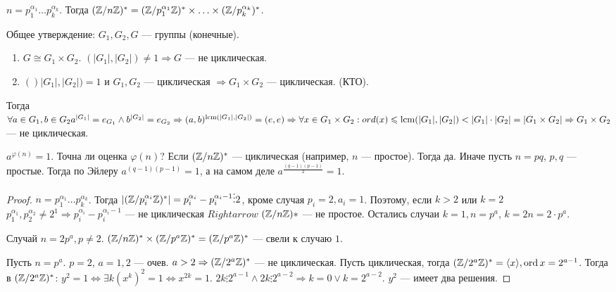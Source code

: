     $n = p_1^{\alpha_1} \ldots p_k^{\alpha_k}$. Тогда $(\mathbb{Z} / n \mathbb{Z})^* = (\mathbb{Z} / p_1^{\alpha_1} \mathbb{Z})^* \times \ldots \times (\mathbb{Z} / p_k ^{\alpha_k})^*$. 

    Общее утверждение:  $G_1, G_2, G$ --- группы (конечные). 
    \begin{enumerate}
        \item $G \cong G_1 \times G_2$. $(|G_1|, |G_2|) \neq 1 \Rightarrow G$ --- не циклическая.
        \item $()|G_1|, |G_2|) = 1$ и $G_1, G_2$ --- циклическая $\Rightarrow G_1 \times G_2$ --- циклическая. (КТО).
    \end{enumerate}

    Тогда $\forall a \in G_1, b \in G_2 a^{|G_1|} = e_{G_1} \land b^{|G_2|} = e_{G_2} \Rightarrow (a, b)^{\operatorname*{lcm}(|G_1|, |G_2|)} = (e, e) \Rightarrow \forall x \in G_1 \times G_2: ord(x) \leqslant \operatorname*{lcm}(|G_1|, |G_2|) < |G_1| \cdot |G_2| = |G_1\times G_2| \Rightarrow G_1 \times G_2$ --- не циклическая.
\begin{remark}
    $a^{\varphi(n)} = 1$. Точна ли оценка  $\varphi(n)$? Если  $(\mathbb{Z} / n\mathbb{Z})^*$ --- циклическая (например, $n$ --- простое). Тогда да. Иначе пусть $n = pq$,  $p,q$ --- простые. Тогда  по Эйлеру $a^{(q-1)(p-1)} = 1$, а на самом деле  $a^{\frac{(q-1)(p-1)}{2}} = 1$. 
\end{remark}
\begin{proof}
    $n = p_1^{\alpha_1} \ldots p_k^{\alpha_k}$. Тогда $|(\mathbb{Z} / p_i^{\alpha_i} \mathbb{Z})^*| = p_i^{\alpha_i} - p_i^{\alpha_i - 1} \vdots 2$, кроме случая  $p_i = 2, a_i = 1$. Поэтому, если  $k > 2$ или  $k = 2$ $p_1^{\alpha_1}, p_2^{\alpha_2} \neq 2^1 \Rightarrow p_i^{\alpha_i} - p_i^{\alpha_i - 1}$ --- не циклическая  $Rightarrow$  $(\mathbb{Z} / n\mathbb{Z})*$ --- не простое. Остались случаи  $k=1, n=p^a$,  $k=2 n = 2 \cdot p^a$.

    Случай  $n = 2p^a, p \neq 2$.  $(\mathbb{Z} / n \mathbb{Z})^* \times (\mathbb{Z} / p^a \mathbb{Z})^* = (\mathbb{Z} / p^a \mathbb{Z})^*$ --- свели к случаю  $1$.

    Пусть  $n = p^a$.  $p=2$,  $a = 1,2$ --- очев.  $a>2 \Rightarrow (\mathbb{Z} / 2^a \mathbb{Z})^*$ --- не циклическая. Пусть циклическая, тогда $(\mathbb{Z} / 2^a \mathbb{Z})^* = \langle x \rangle, \operatorname{ord} x = 2^{a-1}$. Тогда  в $(\mathbb{Z} / 2^a \mathbb{Z})^*$:  $y^2 = 1 \iff \exists k (x^k)^2 = 1 \iff x^{2k} = 1$. $2k \vdots 2^{a-1} \land 2k \vdots 2^{a-2} \Rightarrow k = 0 \lor k = 2^{a-2}$. $y^2$ --- имеет два решения.
\end{proof}

